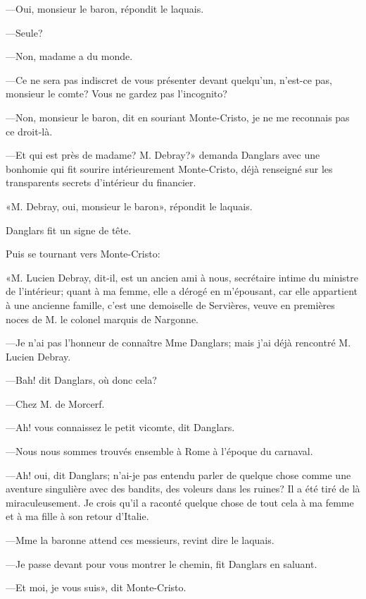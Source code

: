 —Oui, monsieur le baron, répondit le laquais. 

—Seule?  

—Non, madame a du monde. 

—Ce ne sera pas indiscret de vous présenter devant quelqu'un, n'est-ce pas, monsieur le comte? Vous ne gardez pas l'incognito? 

—Non, monsieur le baron, dit en souriant Monte-Cristo, je ne me reconnais pas ce droit-là. 

—Et qui est près de madame? M. Debray?» demanda Danglars avec une bonhomie qui fit sourire intérieurement Monte-Cristo, déjà renseigné sur les transparents secrets d'intérieur du financier. 

«M. Debray, oui, monsieur le baron», répondit le laquais. 

Danglars fit un signe de tête. 

Puis se tournant vers Monte-Cristo: 

«M. Lucien Debray, dit-il, est un ancien ami à nous, secrétaire intime du ministre de l'intérieur; quant à ma femme, elle a dérogé en m'épousant, car elle appartient à une ancienne famille, c'est une demoiselle de Servières, veuve en premières noces de M. le colonel marquis de Nargonne. 

—Je n'ai pas l'honneur de connaître Mme Danglars; mais j'ai déjà rencontré M. Lucien Debray. 

—Bah! dit Danglars, où donc cela?  

—Chez M. de Morcerf. 

—Ah! vous connaissez le petit vicomte, dit Danglars. 

—Nous nous sommes trouvés ensemble à Rome à l'époque du carnaval. 

—Ah! oui, dit Danglars; n'ai-je pas entendu parler de quelque chose comme une aventure singulière avec des bandits, des voleurs dans les ruines? Il a été tiré de là miraculeusement. Je crois qu'il a raconté quelque chose de tout cela à ma femme et à ma fille à son retour d'Italie. 

—Mme la baronne attend ces messieurs, revint dire le laquais.  

—Je passe devant pour vous montrer le chemin, fit Danglars en saluant. 

—Et moi, je vous suis», dit Monte-Cristo. 